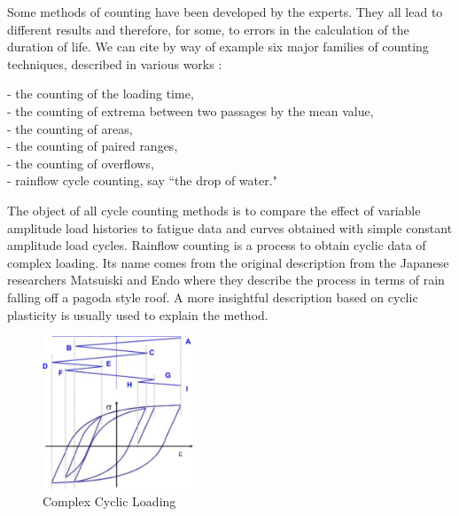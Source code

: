 Some methods of counting have been developed by the experts. They all lead to different results and therefore, for some, to errors in the calculation of the duration of life. We can cite by way of example six major families of counting techniques,
described in various works \cite{ASTM1985}:

\vspace{6pt}
\noindent
- the counting of the loading time,\\
- the counting of extrema between two passages by the mean value,\\
- the counting of areas,\\
- the counting of paired ranges,\\
- the counting of overflows,\\
- rainflow cycle counting, say ``the drop of water."
\vspace{6pt}

The object of all cycle counting methods is to compare the effect of variable amplitude load histories to fatigue data and curves obtained with simple constant amplitude load cycles. Rainflow counting is a process to obtain cyclic data of complex loading. Its name comes from the original description from the Japanese researchers Matsuiski and Endo where they describe the process in terms of rain falling off a pagoda style roof. A more insightful description based on cyclic plasticity is usually used to explain the method.

\begin{figure}[!h]
	\centering
	\includegraphics[width=0.4\textwidth]{figures//rainflow.jpg} 
	\caption{Complex Cyclic Loading}
	\label{rainflow}
\end{figure}

